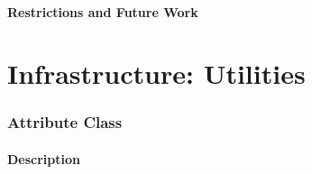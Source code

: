 \documentclass[english]{article}
\begin{document}
\subsection{Restrictions and Future Work}


%
%
\newpage
%
\newpage
\begin{htmlonly}
\end{htmlonly}
\part{Infrastructure: Utilities}
\newpage

\newpage
%
\section{Attribute Class}
\subsection{Description}

\end{document}
